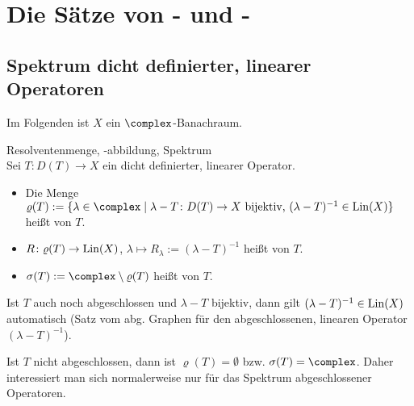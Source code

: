 \section{%
    Die Sätze von - und -%
}

\subsection{%
    Spektrum dicht definierter, linearer Operatoren%
}

\begin{Bem}
    Im Folgenden ist $X$ ein $\complex$-Banachraum.
\end{Bem}

\begin{Def}{Resolventenmenge, -abbildung, Spektrum}\\
    Sei $T\colon D(T) \rightarrow X$ ein dicht definierter, linearer Operator.
    \begin{itemize}
        \item
        Die Menge $\varrho(T) := \{\lambda \in \complex \;|\;
        \text{$\lambda-T\colon D(T) \rightarrow X$ bijektiv, $(\lambda-T)^{-1} \in \Lin(X)$}\}$
        heißt  von $T$.

        \item
        $R\colon \varrho(T) \rightarrow \operatorname{Lin}(X)$, $\lambda \mapsto R_\lambda := (\lambda-T)^{-1}$
        heißt  von $T$.

        \item
        $\sigma(T) := \complex \setminus \varrho(T)$ heißt  von $T$.
    \end{itemize}
\end{Def}

\begin{Bem}
    Ist $T$ auch noch abgeschlossen und $\lambda - T$ bijektiv, dann gilt
    $(\lambda-T)^{-1} \in \operatorname{Lin}(X)$ automatisch
    (Satz vom abg. Graphen für den abgeschlossenen,
    linearen Operator $(\lambda - T)^{-1}$).
\end{Bem}

\begin{Bem}
    Ist $T$ nicht abgeschlossen, dann ist $\varrho(T) = \emptyset$ bzw. $\sigma(T) = \complex$.
    Daher interessiert man sich normalerweise nur für das Spektrum abgeschlossener Operatoren.
\end{Bem}

\linie

